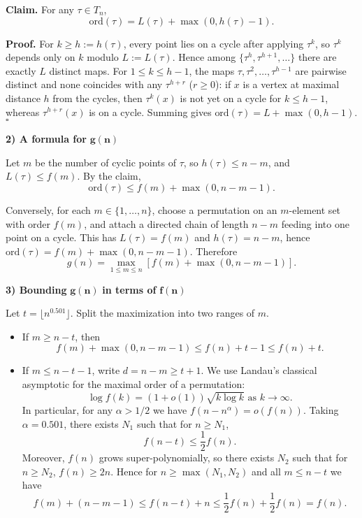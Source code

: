 \documentclass[12pt,a4paper]{article}
\theoremstyle{definition}
\begin{document}
    \textbf{Claim.} For any $\tau \in T_n$,
    $$\text{ord}(\tau) = L(\tau) + \max(0, h(\tau) - 1).$$

    \textbf{Proof.} For $k \geq h := h(\tau)$, every point lies on a cycle after applying $\tau^k$, so $\tau^k$ depends only on $k$ modulo $L := L(\tau)$. Hence among $\{\tau^h, \tau^{h+1}, \ldots\}$ there are exactly $L$ distinct maps. For $1 \leq k \leq h - 1$, the maps $\tau, \tau^2, \ldots, \tau^{h-1}$ are pairwise distinct and none coincides with any $\tau^{h+r}$ ($r \geq 0$): if $x$ is a vertex at maximal distance $h$ from the cycles, then $\tau^k(x)$ is not yet on a cycle for $k \leq h - 1$, whereas $\tau^{h+r}(x)$ is on a cycle. Summing gives $\text{ord}(\tau) = L + \max(0, h - 1)$. $\square$

    \textbf{2) A formula for} $\mathbf{g(n)}$

    Let $m$ be the number of cyclic points of $\tau$, so $h(\tau) \leq n - m$, and $L(\tau) \leq f(m)$. By the claim,
    $$\text{ord}(\tau) \leq f(m) + \max(0, n - m - 1).$$

    Conversely, for each $m \in \{1, \ldots, n\}$, choose a permutation on an $m$-element set with order $f(m)$, and attach a directed chain of length $n - m$ feeding into one point on a cycle. This has $L(\tau) = f(m)$ and $h(\tau) = n - m$, hence $\text{ord}(\tau) = f(m) + \max(0, n - m - 1)$. Therefore
    $$g(n) = \max_{1 \leq m \leq n} \left[ f(m) + \max(0, n - m - 1) \right].$$

    \textbf{3) Bounding} $\mathbf{g(n)}$ \textbf{in terms of} $\mathbf{f(n)}$

    Let $t = \lfloor n^{0.501} \rfloor$. Split the maximization into two ranges of $m$.

    \begin{itemize}
        \item If $m \geq n - t$, then
        $$f(m) + \max(0, n - m - 1) \leq f(n) + t - 1 \leq f(n) + t.$$

        \item If $m \leq n - t - 1$, write $d = n - m \geq t + 1$. We use Landau's classical asymptotic for the maximal order of a permutation:
        $$\log f(k) = (1 + o(1)) \sqrt{k \log k} \text{ as } k \to \infty.$$
        In particular, for any $\alpha > 1/2$ we have $f(n - n^\alpha) = o(f(n))$. Taking $\alpha = 0.501$, there exists $N_1$ such that for $n \geq N_1$,
        $$f(n - t) \leq \frac{1}{2} f(n).$$
        Moreover, $f(n)$ grows super-polynomially, so there exists $N_2$ such that for $n \geq N_2$, $f(n) \geq 2n$. Hence for $n \geq \max(N_1, N_2)$ and all $m \leq n - t$ we have
        $$f(m) + (n - m - 1) \leq f(n - t) + n \leq \frac{1}{2} f(n) + \frac{1}{2} f(n) = f(n).$$
    \end{itemize}
\end{document}
